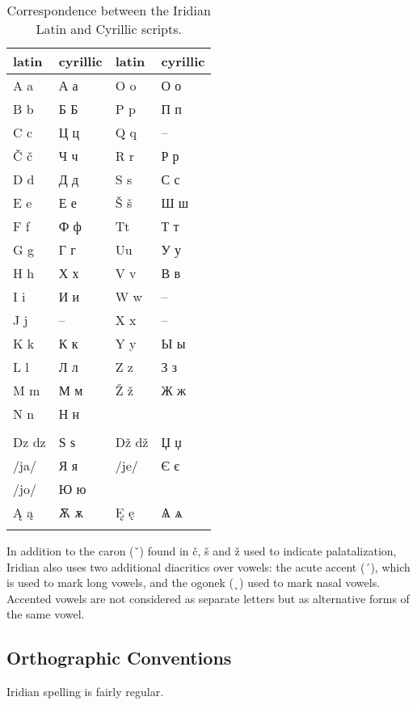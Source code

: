 \begin{table}[h]
	\footnotesize\sffamily
 	\caption{Correspondence between the Iridian Latin and Cyrillic scripts.}
	\medskip
	\begin{tabu}to 0.8 
		\toprule
		{{\sc  latin}} & {\sc cyrillic} & {{\sc  latin}} & {\sc cyrillic} \\
		\midrule\addlinespace
		A a 		& А а	& O o   & О о \\ 
		B b			& Б Б 	& P p 	& П п \\
		C c 		& Ц ц 	& Q q 	& -- \\
		Č č 		& Ч ч 	& R r 	& Р р \\
		D d 		& Д д	& S s 	& С с \\
		E e 		& Е е 	& Š š 	& Ш ш \\
		F f			& Ф ф	& Tt 	& Т т \\
		G g 		& Г г	& Uu	& У у \\
		H h			& Х х	& V v   & В в\\
		I i			& И и	& W w   & --\\
		J j			& --	& X x   & --\\
		K k			& К к	& Y y   & Ы ы\\
		L l			& Л л   & Z z   & З з\\
		M m 		& М м   & Ž ž   & Ж ж\\
		N n 		& Н н   &&\\\addlinespace
		\\\addlinespace
		Dz dz 		& Ѕ ѕ 	& Dž dž & Џ џ\\
		/ja/ 		& Я я	&/je/ & Є є\\
		/jo/		& Ю ю   & &\\
		\k{A} \k{a} & Ѫ ѫ&\k{E} \k{e}&Ѧ ѧ\\ \addlinespace
		\bottomrule
	\end{tabu}
\end{table}
 
In addition to the caron (ˇ) found in č, š and ž used to indicate
palatalization, Iridian also uses two additional diacritics over vowels: the
acute accent (´), which is used to mark long vowels, and the ogonek (˛) used to
mark nasal vowels. Accented vowels are not considered as separate letters but as
alternative forms of the same vowel.

\subsection{Orthographic Conventions}
Iridian spelling is fairly regular.

